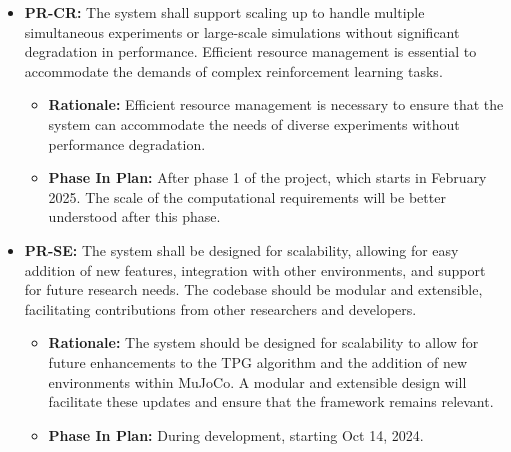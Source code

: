 \documentclass[12pt]{article}
\begin{document}
\begin{itemize}
\item \label{PR-CR} \textbf{PR-CR:} The system shall support scaling up to handle multiple simultaneous experiments or large-scale simulations without significant degradation in performance. Efficient resource management is essential to accommodate the demands of complex reinforcement learning tasks.
  \begin{itemize}
    \item \textbf{Rationale:} Efficient resource management is necessary to ensure that the system can accommodate the needs of diverse experiments without performance degradation.
    \item \textbf{Phase In Plan:} After phase 1 of the project, which starts in February 2025. The scale of the computational requirements will be better understood after this phase.
  \end{itemize}

\item \label{PR-SE} \textbf{PR-SE:} The system shall be designed for scalability, allowing for easy addition of new features, integration with other environments, and support for future research needs. The codebase should be modular and extensible, facilitating contributions from other researchers and developers.
  \begin{itemize}
    \item \textbf{Rationale:} The system should be designed for scalability to allow for future enhancements to the TPG algorithm and the addition of new environments within MuJoCo. A modular and extensible design will facilitate these updates and ensure that the framework remains relevant.
    \item \textbf{Phase In Plan:} During development, starting Oct 14, 2024.
  \end{itemize}


\end{itemize}
\end{document}
